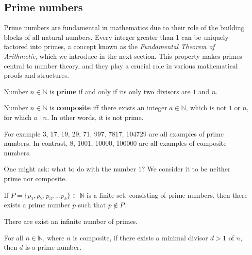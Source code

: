 \documentclass[../lecture-notes-148x210.tex]{subfiles}
\begin{document}
\subsection{Prime numbers}

Prime numbers are fundamental in mathematics due to their role of the building
blocks of all natural numbers. Every integer greater than 1 can be uniquely
factored into primes, a concept known as the \emph{Fundamental Theorem of
Arithmetic}, which we introduce in the next section. This property makes primes
central to number theory, and they play a crucial role in various mathematical
proofs and structures.

\begin{definition}
    Number $n \in \mathbb{N}$ is \textbf{prime} if and only if its only two divisors are $1$
    and $n$. 
\end{definition}

\begin{definition}
    Number $n \in \mathbb{N}$ is \textbf{composite} iff there exists an integer
    $a \in \mathbb{N}$, which is not $1$ or $n$, for which $a \mid n$. In other words,
    it is not prime.
\end{definition}

\begin{example}
    For example 3, 17, 19, 29, 71, 997, 7817, 104729 are all examples of prime numbers.
    In contrast, 8, 1001, 10000, 100000 are all examples of composite numbers.
\end{example}

One might ask: what to do with the number $1$? We consider it to be neither prime 
nor composite.


\begin{theorem} 
    If $P = \{p_1, p_2, p_3, \dots p_k\} \subset \mathbb{N}$ is a finite set,
    consisting of prime numbers, then there exists a prime number $p$ such that
    $p \notin P$.
\end{theorem}

\begin{corollary}
    There are exist an infinite number of primes.
\end{corollary}

\begin{lemma}
    For all $n \in \mathbb{N}$, where $n$ is composite, if there exists a 
    minimal divisor $d>1$ of $n$, then $d$ is a prime number.
\end{lemma}
\end{document}
